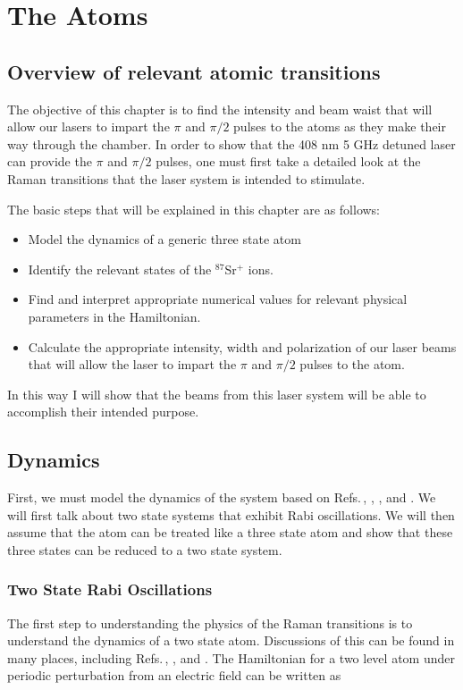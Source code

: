 \chapter{The Atoms} \label{ChapterAboutTheAtoms}
\section{Overview of relevant atomic transitions}

The objective of this chapter is to find the intensity and beam waist that will allow our lasers to impart the $\pi$ and $\pi/2$ pulses to the atoms as they make their way through the chamber. In order to show that the 408 nm 5 GHz detuned laser can provide the $\pi$ and $\pi/2$ pulses, one must first take a detailed look at the Raman transitions that the laser system is intended to stimulate.

The basic steps that will be explained in this chapter are as follows:
\begin{itemize}
\item Model the dynamics of a generic three state atom
\item Identify the relevant states of the $^{87}$Sr$^+$ ions.
\item Find and interpret appropriate numerical values for relevant physical parameters in the Hamiltonian.
\item Calculate the appropriate intensity, width and polarization of our laser beams that will allow the laser to impart the $\pi$ and $\pi/2$ pulses to the atom. 
\end{itemize}
In this way I will show that the beams from this laser system will be able to accomplish their intended purpose.

\section{Dynamics}\label{dynamicsSection}

First, we must model the dynamics of the system based on Refs.\,\cite{Young1997363}, \cite{gustavsonThesis}, \cite{footAtomicPhysics}, \cite{cjeDiss} and \cite{RamanBeamSplit}. 
We will first talk about two state systems that exhibit Rabi oscillations. We will then assume that the atom can be treated like a three state atom and show that these three states can be reduced to a two state system. 

\subsection{Two State Rabi Oscillations}
The first step to understanding the physics of the Raman transitions is to understand the dynamics of a two state atom. Discussions of this can be found in many places, including Refs.\,\cite{cohenTannoudji}, \cite{demilleBudkerKimball}, and \cite{Young1997363}. The Hamiltonian for a two level atom under periodic perturbation from an electric field can be written as 

